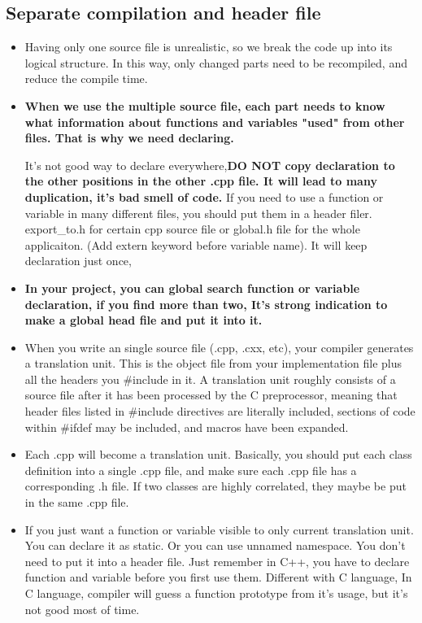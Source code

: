 \documentclass[a4paper,12pt,twoside]{book}
\begin{document}
\subsection{Separate compilation and header file}
\begin{itemize}
	\item Having only one source file is unrealistic, so we break the code up into its logical structure. In this way, only changed parts need to be recompiled, and reduce the compile time.
	
	\item \textbf{When we use the multiple source file, each part needs to know what information about functions and variables "used" from other files. That is why we need declaring.}
	
	It's not good way to declare everywhere,\textbf{DO NOT copy declaration to the other positions in the other .cpp file. It will lead to many duplication, it's bad smell of code.} If you need to use a function or variable in many different files, you should put them in a header filer. export\_to.h for certain cpp source file or global.h file for the whole applicaiton.  (Add extern keyword before variable name).  It will keep declaration just once, 
	
	\item \textbf{In your project, you can global search function or variable declaration, if you find more than two, It's strong indication to make a global head file and put it into it.}
	
	\item When you write an single source file (.cpp, .cxx, etc),  your compiler generates a translation unit. This is the object file from your implementation file plus all the headers you \#include in it.  A translation unit roughly consists of a source file after it has been processed by the C preprocessor, meaning that header files listed in \#include directives are literally included, sections of code within \#ifdef may be included, and macros have been expanded.
	
	\item Each .cpp will become a translation unit. Basically, you should put each class definition into a single .cpp file, and make sure each .cpp file has a corresponding .h file.  If two classes are highly correlated, they maybe be put in the same .cpp file.
	
	\item If you just want a function or variable visible to only current translation unit. You can declare it as static. Or you can use unnamed namespace.  You don't need to put it into a header file.  Just remember in C++, you have to declare function and variable before you first use them. Different with C language, In C language, compiler will guess a function prototype from it's usage, but it's not good most of time.
	


\end{itemize}
\end{document}
